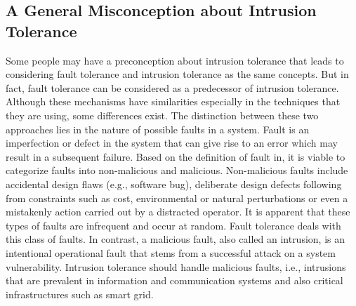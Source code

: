 \documentclass[preprint,number,12pt]{elsarticle}
\begin{document}
\subsection{A General Misconception about Intrusion Tolerance}
Some people may have a preconception about intrusion tolerance that leads to considering fault tolerance and intrusion tolerance as the same concepts. But in fact, fault tolerance can be considered as a predecessor of intrusion tolerance. Although these mechanisms have similarities especially in the techniques that they are using, some differences exist. The distinction between these two approaches lies in the nature of possible faults in a system. Fault is an imperfection or defect in the system that can give rise to an error which may result in a subsequent failure. Based on the definition of fault in\citep{Deswarte2006432,Sterbenz20101245},
 it is viable to categorize faults into non-malicious and malicious. Non-malicious faults include accidental design flaws (e.g., software bug), deliberate design defects following from constraints such as cost, environmental or natural perturbations or even a mistakenly action carried out by a distracted operator. It is apparent that these types of faults are infrequent and occur at random. Fault tolerance deals with this class of faults. In contrast, a malicious fault, also called an intrusion, is an intentional operational fault that stems from a successful attack on a system vulnerability. Intrusion tolerance should handle malicious faults, i.e., intrusions that are prevalent in information and communication systems and also critical infrastructures such as smart grid.
\end{document}
